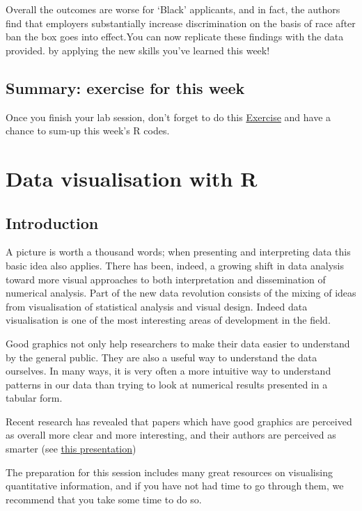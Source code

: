 \documentclass[
]{book}
\begin{document}
Overall the outcomes are worse for `Black' applicants, and in fact, the authors find that employers substantially increase discrimination on the basis of race after ban the box goes into effect.You can now replicate these findings with the data provided. by applying the new skills you've learned this week!

\section{Summary: exercise for this week}\label{summary-exercise-for-this-week-1}

Once you finish your lab session, don't forget to do this \href{https://eonk.shinyapps.io/MCD_ex}{Exercise} and have a chance to sum-up this week's R codes.

\chapter{Data visualisation with R}\label{data-visualisation-with-r}

\section{Introduction}\label{introduction}

A picture is worth a thousand words; when presenting and interpreting data this basic idea also applies. There has been, indeed, a growing shift in data analysis toward more visual approaches to both interpretation and dissemination of numerical analysis. Part of the new data revolution consists of the mixing of ideas from visualisation of statistical analysis and visual design. Indeed data visualisation is one of the most interesting areas of development in the field.

Good graphics not only help researchers to make their data easier to understand by the general public. They are also a useful way to understand the data ourselves. In many ways, it is very often a more intuitive way to understand patterns in our data than trying to look at numerical results presented in a tabular form.

Recent research has revealed that papers which have good graphics are perceived as overall more clear and more interesting, and their authors are perceived as smarter (see \href{https://vimeo.com/181771433}{this presentation})

The preparation for this session includes many great resources on visualising quantitative information, and if you have not had time to go through them, we recommend that you take some time to do so.
\end{document}
